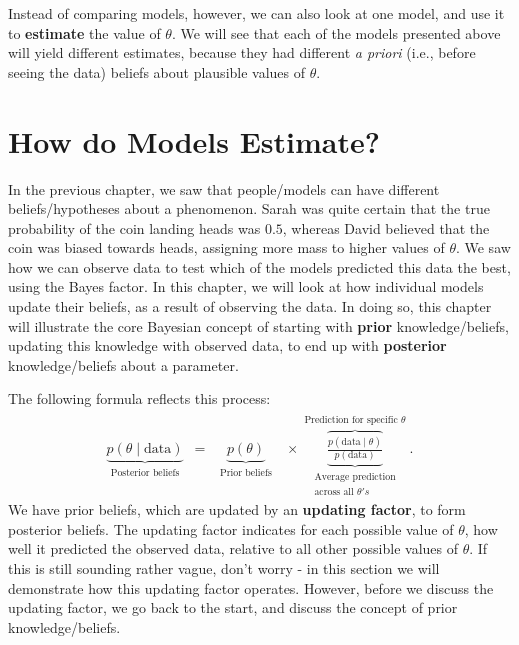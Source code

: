 \documentclass[
  letterpaper,
  DIV=11,
  numbers=noendperiod]{scrreprt}
\begin{document}
Instead of comparing models, however, we can also look at one model, and
use it to \textbf{estimate} the value of \(\theta\). We will see that
each of the models presented above will yield different estimates,
because they had different \emph{a priori} (i.e., before seeing the
data) beliefs about plausible values of \(\theta\).


\hypertarget{model-estimation-section}{%
\chapter{How do Models Estimate?}\label{model-estimation-section}}

In the previous chapter, we saw that people/models can have different
beliefs/hypotheses about a phenomenon. Sarah was quite certain that the
true probability of the coin landing heads was \(0.5\), whereas David
believed that the coin was biased towards heads, assigning more mass to
higher values of \(\theta\). We saw how we can observe data to test
which of the models predicted this data the best, using the Bayes
factor. In this chapter, we will look at how individual models update
their beliefs, as a result of observing the data. In doing so, this
chapter will illustrate the core Bayesian concept of starting with
\textbf{prior} knowledge/beliefs, updating this knowledge with observed
data, to end up with \textbf{posterior} knowledge/beliefs about a
parameter.

The following formula reflects this process: \begin{align}
\label{eq:BinomialEstimation}
\underbrace{ p(\theta \mid \text{data})}_{\substack{\text{Posterior beliefs}}} \,\,\, = \,\,\,
\underbrace{ p(\theta)}_{\substack{\text{Prior beliefs} }}
\,\,\,\, \times
\overbrace{\underbrace{\frac{p( \text{data} \mid \theta)}{p( \text{data})}}}^{\substack{\text{Prediction for specific }\theta }}_{\substack{\text{Average prediction} \\\text{across all }  \theta's}}.
\end{align} We have prior beliefs, which are updated by an
\textbf{updating factor}, to form posterior beliefs. The updating factor
indicates for each possible value of \(\theta\), how well it predicted
the observed data, relative to all other possible values of \(\theta\).
If this is still sounding rather vague, don't worry - in this section we
will demonstrate how this updating factor operates. However, before we
discuss the updating factor, we go back to the start, and discuss the
concept of prior knowledge/beliefs.
\end{document}
